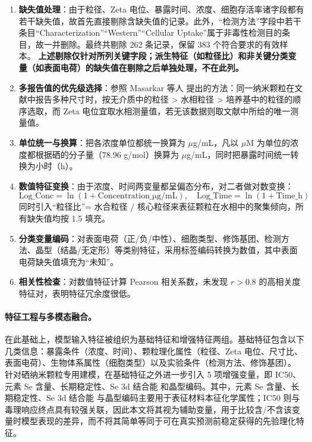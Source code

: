 \documentclass[letterpaper]{article}
\begin{document}
\begin{enumerate}
  \item \textbf{缺失值处理}：由于粒径、Zeta 电位、暴露时间、浓度、细胞存活率诸字段都有若干缺失值，故首先直接剔除含缺失值的记录。此外，“检测方法”字段中若干条目“Characterization”“Western”“Cellular Uptake”属于非毒性检测目的条目，故一并删除。最终共剔除 262 条记录，保留 383 个符合要求的有效样本。
  \textbf{上述剔除仅针对所列关键字段；派生特征（如粒径比）和非关键分类变量（如表面电荷）的缺失值在剔除之后单独处理，不在此列。}

  \item \textbf{多报告值的优先级选择}：参照 Masarkar 等人 \cite{masarkar2024} 提出的方法：同一纳米颗粒在文献中报告多种尺寸时，按无介质中的粒径 > 水相粒径 > 培养基中的粒径的顺序选取，而 Zeta 电位宜取水相测量值，若无该数据则取文献中所给的唯一测量值。

  \item \textbf{单位统一与换算}：把各浓度单位都统一换算为 $\mu$g/mL，凡以 $\mu$M 为单位的浓度都根据硒的分子量（78.96 g/mol）换算为 $\mu$g/mL，同时把暴露时间统一转换为小时（h）。

  \item \textbf{数值特征变换}：由于浓度、时间两变量都呈偏态分布，对二者做对数变换：
        \[
          \text{Log\_Conc} = \ln(1 + \text{Concentration\_μg/mL}), \quad
          \text{Log\_Time} = \ln(1 + \text{Time\_h})
        \]
        同时引入“粒径比”= 水合粒径 / 核心粒径来表征颗粒在水相中的聚集倾向，所有缺失值均按 1.5 填充。

  \item \textbf{分类变量编码}：对表面电荷（正/负/中性）、细胞类型、修饰基团、检测方法、晶型（结晶/无定形）等类别特征，采用标签编码转换为数值，其中表面电荷缺失值填充为“未知”。

  \item \textbf{相关性检查}：对数值特征计算 Pearson 相关系数，未发现 $r > 0.8$ 的高相关度特征对，表明特征冗余度很低。
\end{enumerate}

\paragraph{特征工程与多模态融合。}

在此基础上，模型输入特征被组织为基础特征和增强特征两组。基础特征包含以下几类信息：暴露条件（浓度、时间）、颗粒理化属性（粒径、Zeta 电位、尺寸比、表面电荷）、生物体系属性（细胞类型）以及实验条件（检测方法、修饰基团）。
针对硒纳米颗粒专用建模，在基础特征之外进一步引入 5 项增强变量，即 IC50、元素 Se 含量、长期稳定性、Se 3d 结合能 和晶型编码。其中，元素 Se 含量、长期稳定性、Se 3d 结合能 与晶型编码主要用于表征材料本征化学属性；IC50 则与毒理响应终点具有较强关联，因此本文将其视为辅助变量，用于比较含/不含该变量时模型表现的差异，而不将其简单等同于可在真实预测前稳定获得的先验理化特征。
\end{document}
